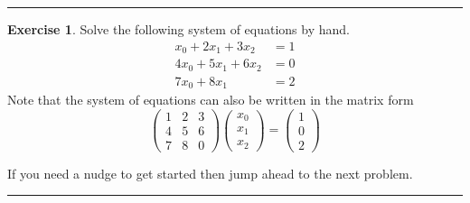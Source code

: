 \documentclass[
]{book}
\theoremstyle{definition}
\theoremstyle{definition}
\theoremstyle{definition}
\newtheorem{exercise}{Exercise}[chapter]
\theoremstyle{remark}
\begin{document}
\begin{center}\rule{0.5\linewidth}{0.5pt}\end{center}

\begin{exercise}
\protect\hypertarget{exr:unnamed-chunk-311}{}{\label{exr:unnamed-chunk-311} }Solve the following system of equations by hand.
\[ \begin{array}{rl} x_0 + 2x_1 + 3x_2 &= 1 \\ 
                    4x_0 + 5x_1 + 6x_2 &= 0 \\
                    7x_0 + 8x_1 &= 2 \end{array} \]
Note that the system of equations can also be written in the matrix form
\[ \begin{pmatrix} 1 & 2 & 3 \\ 4 & 5 & 6 \\ 7 & 8 & 0 \end{pmatrix} \begin{pmatrix} x_0 \\ x_1 \\ x_2 \end{pmatrix} = \begin{pmatrix} 1 \\ 0 \\ 2\end{pmatrix} \]

If you need a nudge to get started then jump ahead to the next problem.
\end{exercise}

\begin{center}\rule{0.5\linewidth}{0.5pt}\end{center}
\end{document}
